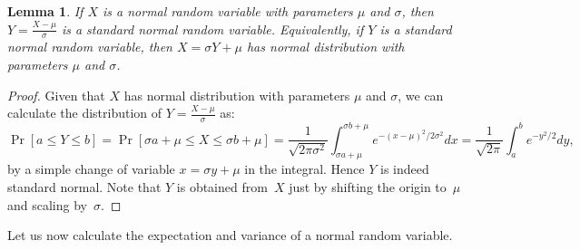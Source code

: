 \documentclass[11pt]{article}
\newcounter{thm}
\newtheorem{lemma}{Lemma}[thm]
\begin{document}
\begin{lemma}\label{lem:normalshift}
If $X$ is a normal random variable with parameters $\mu$ and $\sigma$, then $Y = \frac{X - \mu}{\sigma}$
is a standard normal random variable. Equivalently, if $Y$ is a standard normal random variable, then
$X = \sigma Y + \mu$ has normal distribution with parameters $\mu$ and $\sigma$.
\end{lemma}
\begin{proof}
Given that $X$ has normal distribution with parameters $\mu$ and $\sigma$, we can calculate
the distribution of $Y=\frac{X-\mu}{\sigma}$ as:
$$   \Pr[a\le Y\le b] = \Pr[\sigma a+\mu \le X\le \sigma b+\mu] =
          \frac{1}{\sqrt{2\pi\sigma^2}}\int_{\sigma a+\mu}^{\sigma b+\mu} e^{-(x-\mu)^2/2\sigma^2} dx =
          \frac{1}{\sqrt{2\pi}}\int_{a}^{b} e^{-y^2/2} dy, $$
by a  simple change of variable $x = \sigma y + \mu$ in the integral.  Hence $Y$ is indeed standard normal.
Note that $Y$ is obtained from~$X$ just by shifting the origin to~$\mu$ and scaling by~$\sigma$.
\end{proof}


Let us now calculate the expectation and variance of a normal random variable.
\end{document}
